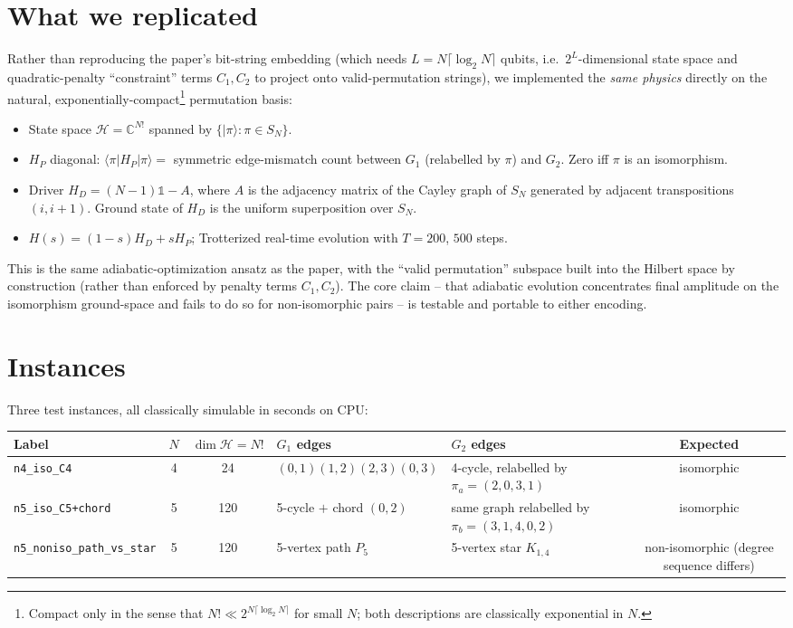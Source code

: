 \documentclass[11pt]{article}
\begin{document}
\section{What we replicated}
Rather than reproducing the paper's bit-string embedding (which needs $L=N\lceil\log_2 N\rceil$ qubits, i.e.\ $2^L$-dimensional state space and quadratic-penalty ``constraint'' terms $C_1,C_2$ to project onto valid-permutation strings), we implemented the \emph{same physics} directly on the natural, exponentially-compact\footnote{Compact only in the sense that $N!\ll 2^{N\lceil\log_2 N\rceil}$ for small $N$; both descriptions are classically exponential in $N$.} permutation basis:
\begin{itemize}
  \item State space $\mathcal{H}=\mathbb{C}^{N!}$ spanned by $\{|\pi\rangle:\pi\in S_N\}$.
  \item $H_P$ diagonal: $\langle\pi|H_P|\pi\rangle=$ symmetric edge-mismatch count between $G_1$ (relabelled by $\pi$) and $G_2$. Zero iff $\pi$ is an isomorphism.
  \item Driver $H_D=(N-1)\mathbb{1}-A$, where $A$ is the adjacency matrix of the Cayley graph of $S_N$ generated by adjacent transpositions $(i,i{+}1)$. Ground state of $H_D$ is the uniform superposition over $S_N$.
  \item $H(s)=(1-s)H_D+sH_P$; Trotterized real-time evolution with $T=200$, $500$ steps.
\end{itemize}
This is the same adiabatic-optimization ansatz as the paper, with the ``valid permutation'' subspace built into the Hilbert space by construction (rather than enforced by penalty terms $C_1,C_2$). The core claim -- that adiabatic evolution concentrates final amplitude on the isomorphism ground-space and fails to do so for non-isomorphic pairs -- is testable and portable to either encoding.

\section{Instances}
Three test instances, all classically simulable in seconds on CPU:
\begin{center}\small
\begin{tabular}{lccp{3cm}p{3cm}c}
\toprule
Label & $N$ & $\dim\mathcal{H}=N!$ & $G_1$ edges & $G_2$ edges & Expected \\
\midrule
\texttt{n4\_iso\_C4}
  & 4 & 24
  & $(0,1)(1,2)(2,3)(0,3)$
  & 4-cycle, relabelled by $\pi_a=(2,0,3,1)$
  & isomorphic \\
\texttt{n5\_iso\_C5+chord}
  & 5 & 120
  & 5-cycle $+$ chord $(0,2)$
  & same graph relabelled by $\pi_b=(3,1,4,0,2)$
  & isomorphic \\
\texttt{n5\_noniso\_path\_vs\_star}
  & 5 & 120
  & 5-vertex path $P_5$
  & 5-vertex star $K_{1,4}$
  & non-isomorphic (degree sequence differs) \\
\bottomrule
\end{tabular}\end{center}
\end{document}
